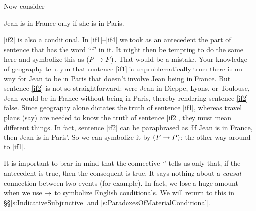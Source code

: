Now consider
\begin{earg}
		\item[\ex{if2}] Jean is in France only if she is in Paris.
\end{earg}

\ref{if2} is also a conditional. In \ref{if1}--\ref{if4} we took as an antecedent the part of sentence that has the word `if' in it. It might then be tempting to do the same here and symbolize this as $(P\rightarrow F)$. That would be a mistake. Your knowledge of geography tells you that sentence \ref{if1} is unproblematically true: there is no way for Jean to be in Paris that doesn't involve Jean being in France. But sentence \ref{if2} is not so straightforward: were  Jean in Dieppe, Lyons, or Toulouse, Jean would be in France without being in Paris, thereby rendering sentence \ref{if2} false. Since geography alone dictates the truth of sentence \ref{if1}, whereas travel plans (say) are needed to know the truth of sentence \ref{if2}, they must mean different things.
In fact, sentence \ref{if2} can be paraphrased as `If Jean is in France, then Jean is in Paris'. So we can symbolize it by $(F \rightarrow P)$: the other way around to \ref{if1}. 

\noindent It is important to bear in mind that the connective `\eif' tells us only that, if the antecedent is true, then the consequent is true. It says nothing about a \emph{causal} connection between two events (for example). In fact, we lose a huge amount when we use $\rightarrow$ to symbolize English conditionals. We will return to this in \S\S\ref{s:IndicativeSubjunctive} and \ref{s:ParadoxesOfMaterialConditional}.

